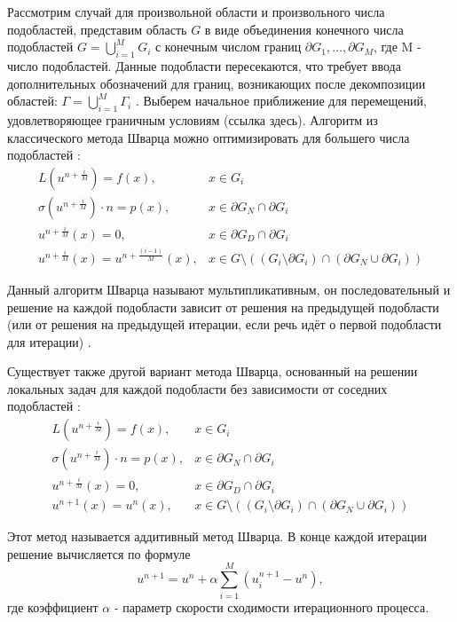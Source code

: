 \documentclass[a4paper, 14pt]{extarticle}
\begin{document}
Рассмотрим случай для произвольной области и произвольного числа подобластей, представим область $G$ в виде объединения конечного числа подобластей $G = \bigcup_{i=1}^{M} G_i$ с конечным числом границ $\partial G_1, \ldots, \partial G_M$, где M - число подобластей. Данные подобласти пересекаются, что требует ввода дополнительных обозначений для границ, возникающих после декомпозиции областей: $\Gamma = \bigcup_{i=1}^{M} \Gamma_i$ \cite{4}. Выберем начальное приближение для перемещений, удовлетворяющее граничным условиям (ссылка здесь). Алгоритм из классического метода Шварца можно оптимизировать для большего числа подобластей \cite{5}:
\begin{equation*}
\begin{array}{rl}
L (u^{n+\frac{i}{M}}) = f(x), & x \in G_i \\
\sigma(u^{n+\frac{i}{M}}) \cdot n = p(x), & x \in \partial G_N \cap \partial G_i \\
u^{n+\frac{i}{M}}(x) = 0, & x \in \partial G_D \cap \partial G_i \\ 
u^{n+\frac{i}{M}}(x) = u^{n+\frac{(i - 1)}{M}}(x), & x \in G \setminus ((G_i \setminus \partial G_i) \cap (\partial G_N \cup \partial G_i))
\end{array}
\end{equation*}

Данный алгоритм Шварца называют мультипликативным, он последовательный и решение на каждой подобласти зависит от решения на предыдущей подобласти (или от решения на предыдущей итерации, если речь идёт о первой подобласти для итерации) \cite{6}.

Существует также другой вариант метода Шварца, основанный на решении локальных задач для каждой подобласти без зависимости от соседних подобластей \cite{7}:
\begin{equation*}
\begin{array}{rl}
L (u^{n+\frac{i}{M}}) = f(x), & x \in G_i \\
\sigma(u^{n+\frac{i}{M}}) \cdot n = p(x), & x \in \partial G_N \cap \partial G_i \\
u^{n+\frac{i}{M}}(x) = 0, & x \in \partial G_D \cap \partial G_i \\ 
u^{n+1}(x) = u^{n}(x), & x \in G \setminus ((G_i \setminus \partial G_i) \cap (\partial G_N \cup \partial G_i))
\end{array}
\end{equation*}

Этот метод называется аддитивный метод Шварца. В конце каждой итерации решение вычисляется по формуле 
\begin{equation*}
u^{n+1} = u^{n} + \alpha \sum_{i=1}^{M} (u_i^{n+1} - u^{n}),
\end{equation*}
где коэффициент $\alpha$ - параметр скорости сходимости итерационного процесса. 
\end{document}
